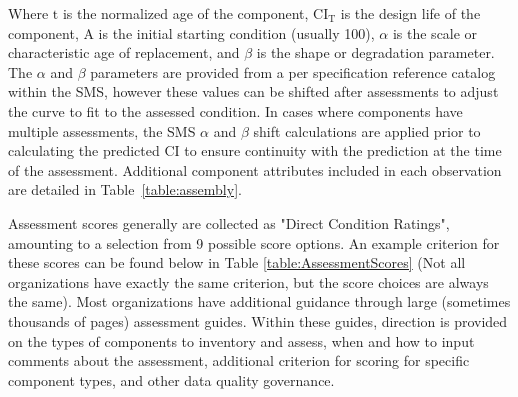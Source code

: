 \documentclass[NewProceedings,letterpaper,NoPageNumbers,NoLineNumbers, DoubleSpace]{ascelike-new}
\begin{document}
Where $\mathrm{t}$ is the normalized age of the component, $\mathrm{CI_T}$ is the design life of the component, A is the initial starting condition (usually 100), $\alpha$ is the scale or characteristic age of replacement, and $\beta$ is the shape or degradation parameter. The $\alpha$ and $\beta$ parameters are provided from a per specification reference catalog within the SMS, however these values can be shifted after assessments to adjust the curve to fit to the assessed condition. In cases where components have multiple assessments, the SMS $\alpha$ and $\beta$ shift calculations are applied prior to calculating the predicted CI to ensure continuity with the prediction at the time of the assessment. Additional component attributes included in each observation are detailed in Table~\ref{table:assembly}.

Assessment scores generally are collected as "Direct Condition Ratings", amounting to a selection from 9 possible score options. An example criterion for these scores can be found below in Table \ref{table:AssessmentScores} (Not all organizations have exactly the same criterion, but the score choices are always the same). Most organizations have additional guidance through large (sometimes thousands of pages) assessment guides. Within these guides, direction is provided on the types of components to inventory and assess, when and how to input comments about the assessment, additional criterion for scoring for specific component types, and other data quality governance. 
\end{document}
